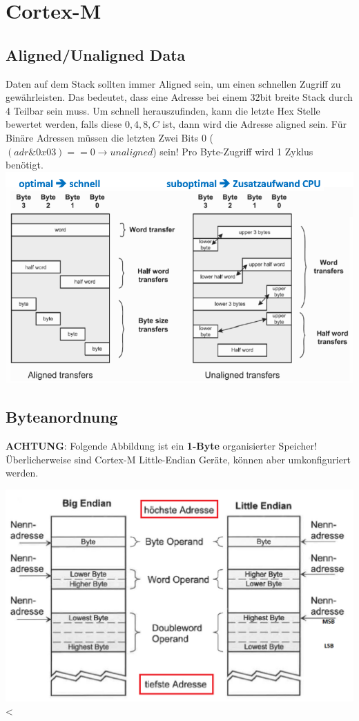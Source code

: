 \section{Cortex-M}
\subsection{Aligned/Unaligned Data}
Daten auf dem Stack sollten immer Aligned sein, um einen schnellen Zugriff zu gewährleisten. Das bedeutet, dass eine Adresse bei einem 32bit breite Stack durch 4 Teilbar sein muss. Um schnell herauszufinden, kann die letzte Hex Stelle bewertet werden, falls diese $0,4,8,C$ ist, dann wird die Adresse aligned sein. Für Binäre Adressen müssen die letzten Zwei Bits 0 ($(adr \& 0x03) == 0 \xrightarrow{} unaligned$)  sein! Pro Byte-Zugriff wird 1 Zyklus benötigt.
\includegraphics[width=\columnwidth]{Images/aligned}

\subsection{Byteanordnung}
\textbf{ACHTUNG}: Folgende Abbildung ist ein \textbf{1-Byte} organisierter Speicher! Überlicherweise sind Cortex-M Little-Endian Geräte, können aber umkonfiguriert werden.
\begin{center}
	\includegraphics[width=\columnwidth]{Images/byteanordnung}<
\end{center}


